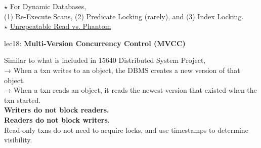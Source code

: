 \documentclass[letterpaper,11pt]{exam}
\begin{document}
\begin{adjustwidth}{2em}{0pt}
  $\star$ For Dynamic Databases, \\ 
    (1) Re-Execute Scans, (2) Predicate Locking (rarely), and (3) Index Locking. \\

  $\star$ \hyperref{https://en.wikipedia.org/wiki/Isolation_%
\end{adjustwidth}

lec18: \textbf{Multi-Version Concurrency Control (MVCC)}
\begin{adjustwidth}{2em}{0pt}
  \begin{spacing}{1.2}
  Similar to what is included in 15640 Distributed System Project,  \\
  → When a txn writes to an object, the DBMS creates a new version of that object. \\
  → When a txn reads an object, it reads the newest version that existed when the txn started. \\

  \textbf{Writers do not block readers.} \\
  \textbf{Readers do not block writers.} \\
  Read-only txns do not need to acquire locks, and use timestamps to determine visibility. \\

  \end{spacing}
\end{adjustwidth}
\vspace*{9em}
\end{document}
